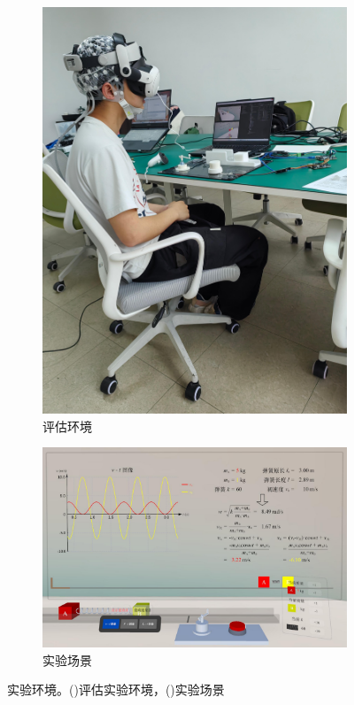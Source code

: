\documentclass[runningheads]{llncs}
\begin{document}
\begin{figure}
  \begin{subfigure}{0.32\linewidth}
    \centering
    \includegraphics[width=\linewidth]{image/experiment-environment.pdf}
    \caption{评估环境}
    \label{fig:experimental-introduction}
  \end{subfigure}
  \hfill
  \begin{subfigure}{0.64\linewidth}
    \centering
    \includegraphics[width=\linewidth]{image/experiment-scenario.pdf}
    \caption{实验场景}
    \label{fig:experimental-operation}
  \end{subfigure}
  \caption{实验环境。()评估实验环境，()实验场景}
  \label{fig:experimental-show}
\end{figure}
\end{document}
